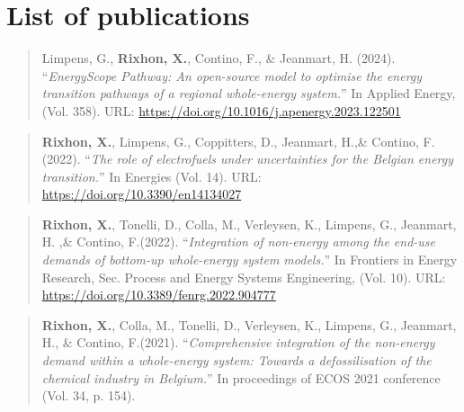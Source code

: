 

\chapter{List of publications}
\vskip0.5cm


\begin{small}

\begin{quote}
Limpens, G., \textbf{Rixhon, X.}, Contino, F., \& Jeanmart, H. (2024). ``\emph{EnergyScope Pathway: An open-source model to optimise the energy transition pathways of a regional whole-energy system.}'' In Applied Energy, (Vol. 358). URL: \url{https://doi.org/10.1016/j.apenergy.2023.122501}
\end{quote}

\begin{quote}
\textbf{Rixhon, X.}, Limpens, G., Coppitters, D., Jeanmart, H.,\& Contino, F.(2022). ``\emph{The role of electrofuels under uncertainties for the Belgian energy transition.}'' In Energies (Vol. 14). URL: \url{https://doi.org/10.3390/en14134027}
\end{quote}

\begin{quote}
\textbf{Rixhon, X.}, Tonelli, D., Colla, M., Verleysen, K., Limpens, G., Jeanmart, H. ,\& Contino, F.(2022). ``\emph{Integration of non-energy among the end-use demands of bottom-up whole-energy system models.}'' In Frontiers in Energy Research, Sec. Process and Energy Systems Engineering, (Vol. 10). URL: \url{https://doi.org/10.3389/fenrg.2022.904777}
\end{quote}

\begin{quote}
\textbf{Rixhon, X.}, Colla, M., Tonelli, D., Verleysen, K.,  Limpens, G., Jeanmart, H., \& Contino, F.(2021). ``\emph{Comprehensive integration of the non-energy demand within a whole-energy system: Towards a defossilisation of the chemical industry in Belgium.}'' In proceedings of  ECOS 2021 conference (Vol. 34, p. 154).
\end{quote}


\end{small}
